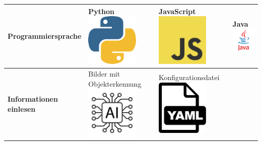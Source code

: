 \documentclass[../main.tex]{subfiles}
\begin{document}
\begin{table}[htbp!]
\begin{tabularx}{\textwidth}{| X | Y | Y | Y |}
        \textbf{Programmiersprache}      &
        Python \newline
        \includegraphics[width=2.5cm]{img/simulation/morphologischer-kasten/python.png} 
        &
        JavaScript \newline
        \includegraphics[width=2.5cm]{img/simulation/morphologischer-kasten/javascript.png}
        &
        Java \newline
        \includegraphics[width=2.5cm]{img/simulation/morphologischer-kasten/java.png}
        \\ \hline
        
        \textbf{Informationen \newline einlesen}  &     
        Bilder mit Objekterkennung \newline
        \includegraphics[width=2.5cm]{img/simulation/morphologischer-kasten/ai-logo.jpg}
        &
        Konfigurationsdatei \newline
        \includegraphics[width=2.5cm]{img/simulation/morphologischer-kasten/yaml.png}
        &
        \\ \hline
        

\end{tabularx}
\end{table}
\end{document}
